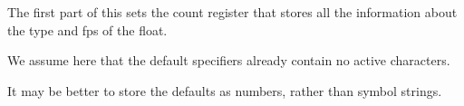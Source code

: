   \begin{macro}{\@xfloat}
     The first part of this sets the count register that stores all
     the information about the type and fps of the float.

    We assume here that the default specifiers already contain no
    active characters.

    It may be better to store the defaults as numbers, rather than
    symbol strings.

    \begin{teX}
\def\@xfloat #1[#2]{%
  \@nodocument
  \def \@captype {#1}%
   \def \@fps {#2}%
   \@onelevel@sanitize \@fps 
   \def \reserved@b {!}%
   \ifx \reserved@b \@fps
     \@fpsadddefault
   \else
     \ifx \@fps \@empty
       \@fpsadddefault
     \fi
   \fi
   \ifhmode
     \@bsphack
     \@floatpenalty -\@Mii
   \else
     \@floatpenalty-\@Miii
   \fi
  \ifinner
     \@parmoderr\@floatpenalty\z@
  \else
    \@next\@currbox\@freelist
      {%
       \@tempcnta \sixt@@n
       \expandafter \@tfor \expandafter \reserved@a
         \expandafter :\expandafter =\@fps 
         \do
          {%
           \if \reserved@a h%
             \ifodd \@tempcnta
             \else
               \advance \@tempcnta \@ne
             \fi
           \fi
           \if \reserved@a t%
             \@setfpsbit \tw@
           \fi
           \if \reserved@a b%
             \@setfpsbit 4%
           \fi
           \if \reserved@a p%
             \@setfpsbit 8%
           \fi
           \if \reserved@a !%
             \ifnum \@tempcnta>15
               \advance\@tempcnta -\sixt@@n\relax
             \fi
           \fi
           }%
       \@tempcntb \csname ftype@\@captype \endcsname
       \multiply \@tempcntb \@xxxii
       \advance \@tempcnta \@tempcntb
       \global \count\@currbox \@tempcnta
       }%
    \@fltovf
  \fi
    \end{teX}
    The remainder sets up the box in which the float is typeset, and
    the typesetting environment to be used.  It is essential to have
    the extra box to avoid the unwanted space that would otherwise
    often be put at the top of the float.

    It ends with a hook; not sure how useful this is but it is needed
    at present to deal with double-column floats.
    \begin{teX}
  \global \setbox\@currbox
    \color@vbox
      \normalcolor
      \vbox \bgroup
        \hsize\columnwidth
        \@parboxrestore
        \@floatboxreset
}
    \end{teX}
  \end{macro}
  
